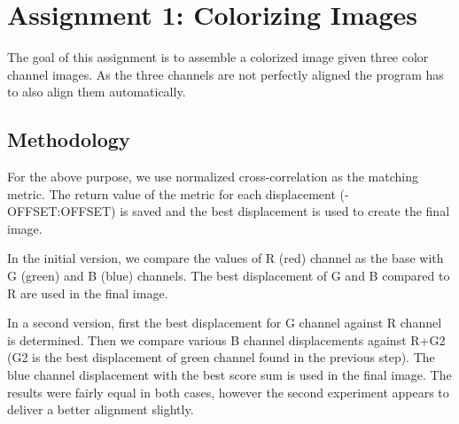 \section{Assignment 1: Colorizing Images}
\label{sec:assignment1}

The goal of this assignment is to assemble a colorized image given three color channel images. As the three channels are not perfectly aligned the program has to also align them automatically.


\subsection{Methodology}

For the above purpose, we use normalized cross-correlation as the matching metric. The return value of the metric for each displacement (-OFFSET:OFFSET) is saved and the best displacement is used to create the final image.

In the initial version, we compare the values of R (red) channel as the base with G (green) and B (blue) channels. The best displacement of G and B compared to R are used in the final image.

In a second version, first the best displacement for G channel against R channel is determined. Then we compare various B channel displacements against R+G2 (G2 is the best displacement of green channel found in the previous step). The blue channel displacement with the best score sum is used in the final image.
The results were fairly equal in both cases, however the second experiment appears to deliver a better alignment slightly.




